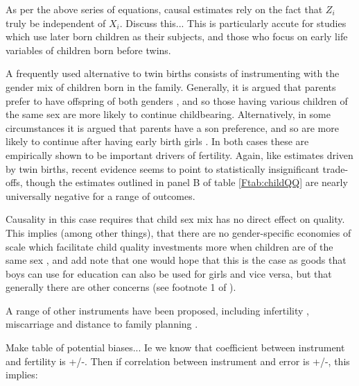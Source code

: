 As per the above series of equations, causal estimates rely on the fact that
$Z_i$ truly be independent of $X_i$.  Discuss this...
This is particularly accute for studies which use later born \citet{Glicketal2007}
children as their subjects, and those who focus on early life variables of 
children born before twins.

A frequently used alternative to twin births consists of instrumenting with the 
gender mix of children born in the family. Generally, it is argued that parents
prefer to have offspring of both genders \citet{ConleyGlauber2006,Angristetal2010,
Beckeretal2010,MillimetWang2011,FitzsimonsMalde2014}, and so those having various 
children of the same sex are more likely to continue childbearing. Alternatively, 
in some circumstances it is argued that parents have a son preference, and so are 
more likely to continue after having early birth girls \citet{Lee2008,
KumarKugler2011}. In both cases these are empirically shown to be important 
drivers of fertility.  Again, like estimates driven by twin births, recent 
evidence seems to point to statistically insignificant trade-offs, though the 
estimates outlined in panel B of table \ref{Ftab:childQQ} are nearly universally 
negative for a range of outcomes.

Causality in this case requires that child sex mix has no direct effect on 
quality.  This implies (among other things), that there are no gender-specific 
economies of scale which facilitate child quality investments more when children
are of the same sex \citet{ButcherCase1994}, and add note that one would hope 
that this is the case as goods that boys can use for education can also be used 
for girls and vice versa, but that generally there are other concerns (see 
footnote 1 of \citet{RosenzweigZhang2009}).


A range of other instruments have been proposed, including infertility
\citep{Bougmaetal2015}, miscarriage \citep{Hotzetal1997,Marlani2008,Miller2009}
and distance to family planning \citep{DangRogers2013}.

Make table of potential biases...  Ie we know that coefficient between 
instrument and fertility is +/-.  Then if correlation between instrument
and error is +/-, this implies:

